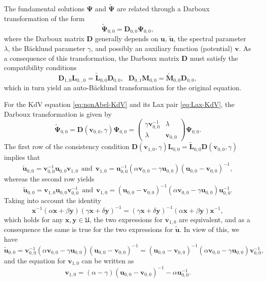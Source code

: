 \documentclass[dvips,10pt]{article}
\newcommand{\bs}{\boldsymbol}
\newcommand{\bsu}{ {\bs{u}}}
\newcommand{\bsx}{ {\bs{x}}}
\newcommand{\bsy}{ {\bs{y}}}
\newcommand{\bsv}{ {\bs{v}}}
\theoremstyle{remark} %
\begin{document}
	The fundamental solutions $\bs{\Psi}$ and $\tilde{\bs{\Psi}}$ are related through a Darboux transformation of the form
	$$	\tilde{{\bs{\Psi}}}_{0,0} = {\bs{D}}_{0,0} {\bs{\Psi}}_{0,0},$$
	where the Darboux matrix $\bs{D}$ generally depends on $\bsu$, $\tilde{\bsu}$, the spectral parameter $\lambda$, the B\"acklund parameter $\gamma$, and possibly an auxiliary function (potential) $\bsv$. As a consequence of this transformation, the Darboux matrix $\bs{D}$ must satisfy the compatibility conditions
	$$ {\bs{D}}_{1,0} {\bs{L}}_{0,,0} = \tilde{\bs{L}}_{0,0} {\bs{D}}_{0,0}, ~~~ {\bs{D}}_{0,1} {\bs{M}}_{0,0} = \tilde{\bs{M}}_{0,0} {\bs{D}}_{0,0},$$
	which in turn yield an auto-B\"acklund transformation for the original equation.
	
	
	For the KdV equation \eqref{eq:nonAbel-KdV} and its Lax pair \eqref{eq:Lax-KdV}, the Darboux transformation is given by
	\begin{equation}
		\tilde{{\bs{\Psi}}}_{0,0} = {\bs{D}}(\bsv_{0,0},\gamma) {\bs{\Psi}}_{0,0} = \begin{pmatrix}
			\gamma \bsv_{0,0}^{-1} & \lambda  \\ \lambda &  \bsv_{0,0} 	\end{pmatrix}   {\bs{\Psi}}_{0,0}.
	\end{equation}
	The first row of the consistency condition ${\bs{D}}(\bsv_{1,0},\gamma) {\bs{L}}_{0,0} = \tilde{\bs{L}}_{0,0} {\bs{D}}(\bsv_{0,0},\gamma)$ implies that 
	$$ \tilde{\bsu}_{0,0} = \bsv_{0,0}^{-1} \bsu_{0,0} \bsv_{1,0} ~~ {\mbox{and}} ~~ \bsv_{1,0} = \bsu_{0,0}^{-1} (\alpha \bsv_{0,0}-\gamma \bsu_{0,0}) (\bsu_{0,0}-\bsv_{0,0})^{-1},$$
	whereas the second row yields
	$$ \tilde{\bsu}_{0,0} = \bsv_{1,0} \bsu_{0,0} \bsv_{0,0}^{-1} ~~ {\mbox{and}} ~~ \bsv_{1,0} = (\bsu_{0,0}-\bsv_{0,0})^{-1} (\alpha \bsv_{0,0}-\gamma \bsu_{0,0}) \bsu_{0,0}^{-1}.$$
	Taking into account the identity 
	\begin{equation} \label{eq:identity}
		\bsx^{-1} \left(\alpha \bsx + \beta \bsy\right) (\gamma \bsx + \delta \bsy)^{-1} = (\gamma \bsx + \delta \bsy)^{-1} \left(\alpha \bsx + \beta \bsy\right) \bsx^{-1}, 
	\end{equation}
	which holds for any $\bsx, \bsy \in {\mathfrak{U}}$, the two expressions for $\bsv_{1,0}$ are equivalent, and as a consequence the same is true for the two expressions for $\tilde{\bsu}$. In view of this, we have 
	$$ \tilde{\bsu}_{0,0} =\bsv_{0,0}^{-1} \left(\alpha \bsv_{0,0}-\gamma \bsu_{0,0} \right) (\bsu_{0,0} - \bsv_{0,0})^{-1} =  (\bsu_{0,0} - \bsv_{0,0})^{-1} \left(\alpha \bsv_{0,0}-\gamma \bsu_{0,0} \right) \bsv_{0,0}^{-1}, $$
	and the equation for $\bsv_{1,0}$ can be written as
	$$ \bsv_{1,0} =  (\alpha  - \gamma ) (\bsu_{0,0}-\bsv_{0,0})^{-1} - \alpha \bsu_{0,0}^{-1}.$$	
	
\end{document}

